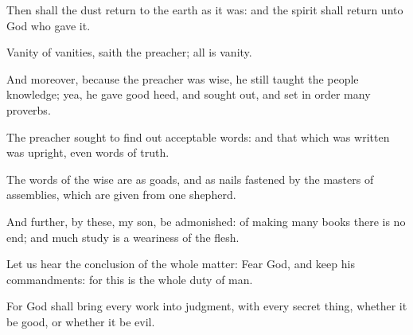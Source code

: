 \Verse Then shall the dust return to the earth as it was: and the spirit shall return unto God who gave it.

\Verse Vanity of vanities, saith the preacher; all is vanity.

\Verse And moreover, because the preacher was wise, he still taught the people knowledge; yea, he gave good heed, and sought out, and set in order many proverbs.

\Verse The preacher sought to find out acceptable words: and that which was written was upright, even words of truth.

\Verse The words of the wise are as goads, and as nails fastened by the masters of assemblies, which are given from one shepherd.

\Verse And further, by these, my son, be admonished: of making many books there is no end; and much study is a weariness of the flesh.

\Verse Let us hear the conclusion of the whole matter: Fear God, and keep his commandments: for this is the whole duty of man.

\Verse For God shall bring every work into judgment, with every secret thing, whether it be good, or whether it be evil.

